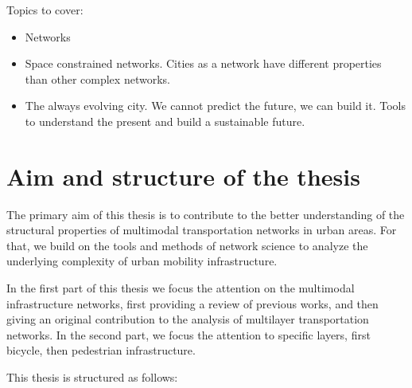 Topics to cover:
\begin{itemize}
    \item Networks
    \item Space constrained networks. Cities as a network have different properties than other complex networks.
    \item The always evolving city. We cannot predict the future, we can build it. Tools to understand the present and build a sustainable future.
\end{itemize}



\section{Aim and structure of the thesis}

The primary aim of this thesis is to contribute to the better understanding of the structural properties of multimodal transportation networks in urban areas. For that, we build on the tools and methods of network science to analyze the underlying complexity of urban mobility infrastructure. 

In the first part of this thesis we focus the attention on the multimodal infrastructure networks, first providing a review of previous works, and then giving an original contribution to the analysis of multilayer transportation networks. In the second part, we focus the attention to specific layers, first bicycle, then pedestrian infrastructure.

This thesis is structured as follows:

